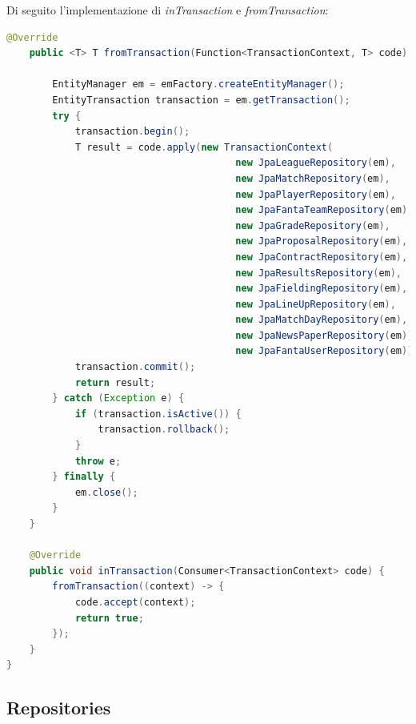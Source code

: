 Di seguito l'implementazione di \textit{inTransaction} e \textit{fromTransaction}:
\begin{lstlisting}[language=Java]
@Override
	public <T> T fromTransaction(Function<TransactionContext, T> code) {

		EntityManager em = emFactory.createEntityManager();
		EntityTransaction transaction = em.getTransaction();
		try {
			transaction.begin();
			T result = code.apply(new TransactionContext(
										new JpaLeagueRepository(em), 
										new JpaMatchRepository(em),
										new JpaPlayerRepository(em), 
										new JpaFantaTeamRepository(em), 
										new JpaGradeRepository(em),
										new JpaProposalRepository(em), 
										new JpaContractRepository(em), 
										new JpaResultsRepository(em),
										new JpaFieldingRepository(em), 
										new JpaLineUpRepository(em), 
										new JpaMatchDayRepository(em),
										new JpaNewsPaperRepository(em), 
										new JpaFantaUserRepository(em)));
			transaction.commit();
			return result;
		} catch (Exception e) {
			if (transaction.isActive()) {
				transaction.rollback();
			}
			throw e;
		} finally {
			em.close();
		}
	}

	@Override
	public void inTransaction(Consumer<TransactionContext> code) {
		fromTransaction((context) -> {
			code.accept(context);
			return true;
		});
	}
}
\end{lstlisting}

\subsection{Repositories}


